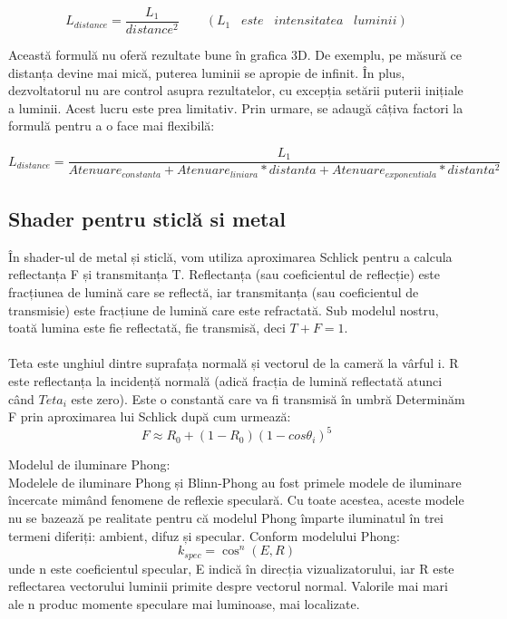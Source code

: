 \documentclass[12pt]{article}
\begin{document}
$$ L_{distance} = \frac{L_1}{distance^2}   \hspace{25pt}    (L_1    \hspace{10pt}este \hspace{10pt}    intensitatea    \hspace{10pt} luminii) $$

Această formulă nu oferă rezultate bune în grafica 3D. De exemplu, pe măsură ce distanța devine mai mică, puterea luminii se apropie de infinit. În plus, dezvoltatorul nu are control asupra rezultatelor, cu excepția setării puterii inițiale a luminii. Acest lucru este prea limitativ. Prin urmare, se adaugă câțiva factori la formulă pentru a o face mai flexibilă:

$$ L_{distance} = \frac{L_1}{Atenuare_{constanta} + Atenuare_{liniara} * distanta + Atenuare_{exponentiala} * distanta^2} $$

\subsection{Shader pentru sticlă si metal}
În shader-ul de metal și sticlă, vom utiliza aproximarea Schlick pentru a calcula reflectanța F și transmitanța T. Reflectanța (sau coeficientul de reflecție) este fracțiunea de lumină care se reflectă, iar transmitanța (sau coeficientul de transmisie) este fracțiune de lumină care este refractată. Sub modelul nostru, toată lumina este fie reflectată, fie transmisă, deci $ T + F = 1. $ \\ \\
Teta este unghiul dintre suprafața normală și vectorul de la cameră la vârful i.
R este reflectanța la incidență normală (adică fracția de lumină reflectată atunci când $ Teta_i $ este zero). Este o constantă care va fi transmisă în umbră
Determinăm F prin aproximarea lui Schlick după cum urmează:
\begin{equation} 
 F \approx R_0 + (1 - R_0)(1 - cos\theta_i)^5
\end{equation}

\newpage
Modelul de iluminare Phong: \\
Modelele de iluminare Phong și Blinn-Phong au fost primele modele de iluminare încercate mimând fenomene de reflexie speculară. Cu toate acestea, aceste modele nu se bazează pe realitate pentru că modelul Phong împarte iluminatul în trei termeni diferiți: ambient, difuz și specular.
Conform modelului Phong:
\begin{equation}
 k_{spec} = \cos^n(E,  R) 
\end{equation}
unde n este coeficientul specular, E indică în direcția vizualizatorului, iar R este  reflectarea vectorului luminii primite despre vectorul normal.
Valorile mai mari ale n produc momente speculare mai luminoase, mai localizate. \\
\end{document}
